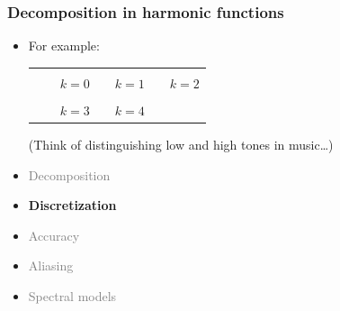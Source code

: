 \documentclass[aspectratio=149,9pt]{beamer}
\begin{document}
\begin{frame}
	\frametitle{Decomposition in harmonic functions}
	\vfill\begin{itemize}
		\item For example:\vspace*{2ex}
			\hspace*{-10pt}\begin{tabular}{@{}r@{}c@{}c@{}c@{}c@{}c@{}c@{}}
				\scalebox{.35}{\small}\raisebox{8mm}{$=$}	& %
												&	\scalebox{.35}{\small}	&
						\raisebox{8mm}{$+$}	&	\scalebox{.35}{\small}	&
						\raisebox{8mm}{$+$}	&	\scalebox{.35}{\small}	\\
					&&	$k=0$	&&	$k=1$	&& $k=2$\\[4mm]
					&	\raisebox{8mm}{$+$}	&	\scalebox{.35}{\small}	&
						\raisebox{8mm}{$+$}	&	\scalebox{.35}{\small}	&
						\raisebox{8mm}{$+$}	&	\raisebox{8mm}{$\ldots$}\\
					&&	$k=3$	&&	$k=4$\\[3mm]
			\end{tabular}\vfill
			\par
			(Think of distinguishing low and high tones in music\ldots)
	\end{itemize}\vfill
\end{frame}
%
%
\begin{frame}
	\begin{itemize}
		\item {\textcolor{gray}{Decomposition}}
		\item {\bfseries Discretization}
		\item {\textcolor{gray}{Accuracy}}
		\item {\textcolor{gray}{Aliasing}}
		\item {\textcolor{gray}{Spectral models}}
	\end{itemize}
\end{frame}
%
%
\end{document}
